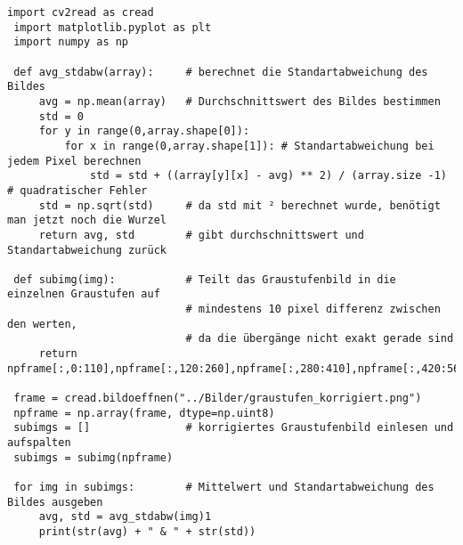 \begin{lstlisting}[style=PYTHON,frame=single,
 caption=einteilung der Graustufen sowie die Berechnung derer Mittelwerte und StdAbw.
 captionpos=b,
 label=lst:Graustufen]
 import cv2read as cread
 import matplotlib.pyplot as plt
 import numpy as np

 def avg_stdabw(array):		# berechnet die Standartabweichung des Bildes
     avg = np.mean(array)   # Durchschnittswert des Bildes bestimmen
     std = 0
     for y in range(0,array.shape[0]):
         for x in range(0,array.shape[1]): # Standartabweichung bei jedem Pixel berechnen
             std = std + ((array[y][x] - avg) ** 2) / (array.size -1) # quadratischer Fehler
     std = np.sqrt(std)		# da std mit ² berechnet wurde, benötigt man jetzt noch die Wurzel
     return avg, std		# gibt durchschnittswert und Standartabweichung zurück

 def subimg(img):			# Teilt das Graustufenbild in die einzelnen Graustufen auf
 							# mindestens 10 pixel differenz zwischen den werten,
 							# da die übergänge nicht exakt gerade sind
     return npframe[:,0:110],npframe[:,120:260],npframe[:,280:410],npframe[:,420:560],npframe[0:460,570:640]
     
 frame = cread.bildoeffnen("../Bilder/graustufen_korrigiert.png")
 npframe = np.array(frame, dtype=np.uint8)
 subimgs = [] 				# korrigiertes Graustufenbild einlesen und aufspalten
 subimgs = subimg(npframe)

 for img in subimgs:		# Mittelwert und Standartabweichung des Bildes ausgeben
     avg, std = avg_stdabw(img)1
     print(str(avg) + " & " + str(std))
\end{lstlisting}